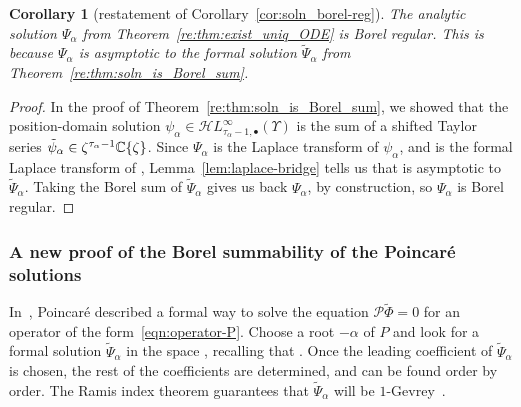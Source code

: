 \documentclass[10pt,a4paper]{amsart}
\newcommand{\singexp}[2]{\mathcal{H}L^\infty_{#1, #2}}
\newcommand{\singexpalg}[1]{\singexp{#1}{\bullet}}
\newcommand{\C}{\mathbb{C}}
\newcommand{\series}[1]{\tilde{#1}}
\numberwithin{equation}{section}
\newtheorem{Corollary}[Theorem]{Corollary}
\begin{document}
\begin{Corollary}[restatement of Corollary~\ref{cor:soln_borel-reg}]\label{re:cor:soln_borel-reg}
The analytic solution $\Psi_\alpha$ from Theorem~{\rm\ref{re:thm:exist_uniq_ODE}} is Borel regular. This is because $\Psi_\alpha$ is asymptotic to the formal solution $\series{\Psi}_\alpha$ from Theorem~{\rm\ref{re:thm:soln_is_Borel_sum}}.
\end{Corollary}
\begin{proof}
In the proof of Theorem~\ref{re:thm:soln_is_Borel_sum}, we showed that the position-domain solution $\psi_\alpha \in \singexpalg{\tau_\alpha-1}(\Upsilon)$ is the sum of a shifted Taylor series $\series{\psi}_\alpha \in\smash{ \zeta^{\tau_\alpha-1} \C\{\zeta\}}$. Since $\Psi_\alpha$ is the Laplace transform of $\psi_\alpha$, and \smash{$\series{\Psi}_\alpha$} is the formal Laplace transform of \smash{$\series{\psi}_\alpha$}, Lemma~\ref{lem:laplace-bridge} tells us that \smash{$\Psi_\alpha$} is asymptotic to $\series{\Psi}_\alpha$. Taking the Borel sum of $\series{\Psi}_\alpha$ gives us back $\Psi_\alpha$, by construction, so $\Psi_\alpha$ is Borel regular.
\end{proof}

\subsubsection{A new proof of the Borel summability of the Poincar\'e solutions}\label{sec:new-summability-proof}
In~\cite{int-irreg}, Poincar\'e described a formal way to solve the equation $\mathcal{P}\series{\Phi} = 0$ for an operator of the form~\eqref{eqn:operator-P}. Choose a root $-\alpha$ of $P$ and look for a formal solution $\series{\Psi}_\alpha$ in the space \smash{${\rm e}^{-z\alpha} z^{-\tau_\alpha}\C\big\llbracket z^{-1} \big\rrbracket$}, recalling that . Once the leading coefficient of $\series{\Psi}_\alpha$ is chosen, the rest of the coefficients are determined, and can be found order by order. The Ramis index theorem guarantees that $\series{\Psi}_\alpha$ will be $1$-Gevrey~\cite{ramis_index}.
\end{document}
